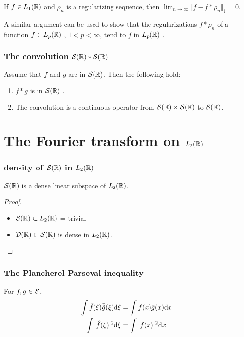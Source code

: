 \begin{frame}
\frametitle{}
\begin{theorem}
If $f\in L_1(\mathbb{R})$ and $\rho_{n}$ is a regularizing sequence, then $\displaystyle \lim_{n\rightarrow\infty}\Vert f-f*\rho_{n}\Vert_{1}=0$.
\end{theorem}
A similar argument can be used to show that the regularizations $f*\rho_{n}$ of a function $f\in L_{p}(\mathbb{R})$ , $ 1<p<\infty$, tend to $f$ in $L_{p}(\mathbb{R})$ .
\end{frame}

\begin{frame}
\frametitle{The convolution $\mathcal{S}(\mathbb{R}) * \mathcal{S}(\mathbb{R})$}
\begin{theorem}
Assume that $f$  and $g$ are in  $\mathcal{S}(\mathbb{R})$. Then the following hold:
\begin{enumerate}[label=(\roman*)]
\item $f*g$ is in $\mathcal{S}(\mathbb{R})$ .
\item The convolution is a continuous operator from $\mathcal{S}(\mathbb{R}) \times \mathcal{S}(\mathbb{R})$  to $\mathcal{S}(\mathbb{R})$.
\end{enumerate}
\end{theorem}
\end{frame}

\section{The Fourier transform on $L_2(\mathbb{R})$}
\begin{frame}
\frametitle{density of $\mathcal{S}(\mathbb{R})$ in $L_2(\mathbb{R})$}
\begin{theorem}
$\mathcal{S}(\mathbb{R})$ is a dense linear subspace of $L_2(\mathbb{R})$.
\end{theorem}
\begin{proof}
\begin{itemize}
\item $\mathcal{S}(\mathbb{R}) \subset L_2(\mathbb{R})$ = trivial
\item $\mathcal{D}(\mathbb{R}) \subset \mathcal{S}(\mathbb{R})$ is dense in $L_2(\mathbb{R})$.
\end{itemize}
\end{proof}
\end{frame}

\begin{frame}
\frametitle{The Plancherel-Parseval inequality}
\begin{theorem}
For $f, g \in \mathcal{S}$,
\begin{align*}
\int \hat{f}(\xi) \bar{\hat{g}}(\xi) \mathrm{d} \xi &= \int f(x) \bar{g}(x) \mathrm{d} x \\
\int |\hat{f}(\xi)|^2 \mathrm{d} \xi &= \int |f(x)|^2 \mathrm{d} x \;.
\end{align*}
\end{theorem}
\end{frame}

